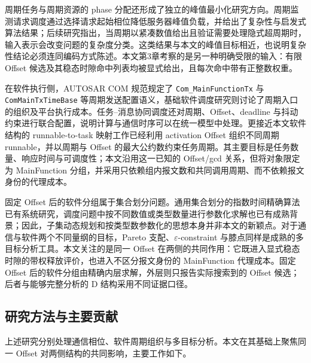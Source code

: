 \documentclass[UTF8,a4paper,twoside,zihao=-4]{ctexart}
\numberwithin{equation}{section}
\numberwithin{figure}{section}
\numberwithin{table}{section}
\theoremstyle{definition}
\numberwithin{algocf}{section}
\begin{document}
周期任务与周期资源的 phase 分配还形成了独立的峰值最小化研究方向。周期监测请求调度通过选择请求起始相位降低服务器峰值负载，并给出了复杂性与启发式算法结果\cite{zeng2006periodic}；后续研究指出，当周期以紧凑数值给出且验证需要处理隐式超周期时，输入表示会改变问题的复杂度分类\cite{short2010periodic}。这类结果与本文的峰值目标相近，也说明复杂性结论必须连同编码方式陈述。本文第3章考察的是另一种明确受限的输入：有限 Offset 候选及其稳态时隙命中列表均被显式给出，且每次命中带有正整数权重。

在软件执行侧，AUTOSAR COM 规范规定了 \texttt{Com\_\allowbreak Main\allowbreak FunctionTx} 与 \texttt{Com\allowbreak MainTx\allowbreak TimeBase} 等周期发送配置语义\cite{autosarcom}，基础软件调度研究则讨论了周期入口的组织及平台执行成本\cite{zhang2011autosar,denil2011devs}。任务--消息协同调度还对周期、Offset、deadline 与抖动约束进行联合配置，说明计算与通信时序可以在统一模型中处理\cite{pimentel2007,minaeva2018,lesi2020}。更接近本文软件结构的 runnable-to-task 映射工作已经利用 activation Offset 组织不同周期 runnable，并以周期与 Offset 的最大公约数约束任务周期\cite{khenfri2015,khenfri2020}。其主要目标是任务数量、响应时间与可调度性；本文沿用这一已知的 Offset/gcd 关系，但将对象限定为 MainFunction 分组，并采用只依赖组内报文数和共同调用周期、而不依赖报文身份的代理成本。

固定 Offset 后的软件分组属于集合划分问题。通用集合划分的指数时间精确算法已有系统研究\cite{bjorklund2009}，调度问题中按不同数值或类型数量进行参数化求解也已有成熟背景\cite{mnich2015}；因此，子集动态规划和按类型数参数化的思想本身并非本文的新颖点。对于通信与软件两个不同量纲的目标，Pareto 支配、$\varepsilon$-constraint 与膝点同样是成熟的多目标分析工具\cite{mavrotas2009,debgupta2011}。本文关注的是同一 Offset 在两侧的共同作用：它既进入显式稳态时隙的带权释放评价，也进入不区分报文身份的 MainFunction 代理成本。固定 Offset 后的软件分组由精确内层求解，外层则只报告实际搜索到的 Offset 候选；后者与能够完整分析的 D 结构采用不同证据口径。

\subsection{研究方法与主要贡献}

上述研究分别处理通信相位、软件周期组织与多目标分析。本文在其基础上聚焦同一 Offset 对两侧结构的共同影响，主要工作如下。
\end{document}
